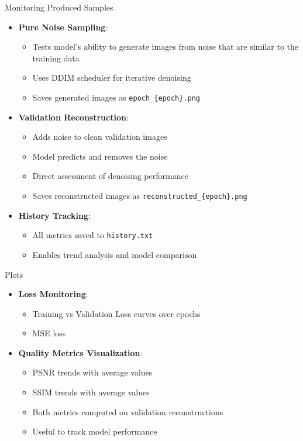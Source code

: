 \begin{frame}{Monitoring Produced Samples}
    \begin{itemize}
        \item \textbf{Pure Noise Sampling}:
              \begin{itemize}
                  \item Tests model's ability to generate images from noise that are similar to the training data
                  \item Uses DDIM scheduler for iterative denoising
                  \item Saves generated images as \texttt{epoch\_\{epoch\}.png}
              \end{itemize}
        \item \textbf{Validation Reconstruction}:
              \begin{itemize}
                  \item Adds noise to clean validation images
                  \item Model predicts and removes the noise
                  \item Direct assessment of denoising performance
                  \item Saves reconstructed images as \texttt{reconstructed\_\{epoch\}.png}
              \end{itemize}
        \item \textbf{History Tracking}:
              \begin{itemize}
                  \item All metrics saved to \texttt{history.txt}
                  \item Enables trend analysis and model comparison
              \end{itemize}
    \end{itemize}
\end{frame}

\begin{frame}{Plots}
    \begin{itemize}
        \item \textbf{Loss Monitoring}:
              \begin{itemize}
                  \item Training vs Validation Loss curves over epochs
                  \item MSE loss
              \end{itemize}
        \item \textbf{Quality Metrics Visualization}:
              \begin{itemize}
                  \item PSNR trends with average values
                  \item SSIM trends with average values
                  \item Both metrics computed on validation reconstructions
                  \item Useful to track model performance
              \end{itemize}
    \end{itemize}
\end{frame}

